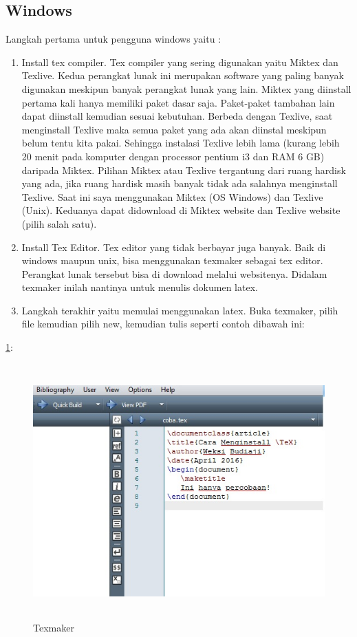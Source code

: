 \subsection{Windows}
\par \vspace{12pt}
Langkah pertama untuk pengguna windows yaitu :

\begin{enumerate}
\item Install tex compiler. Tex compiler yang sering digunakan yaitu Miktex dan Texlive. Kedua perangkat lunak ini merupakan software yang paling banyak digunakan meskipun banyak perangkat lunak yang lain. Miktex yang diinstall pertama kali hanya memiliki paket dasar saja. Paket-paket tambahan lain dapat diinstall kemudian sesuai kebutuhan. Berbeda dengan Texlive, saat menginstall Texlive maka semua paket yang 
ada akan diinstal meskipun belum tentu kita pakai. Sehingga instalasi Texlive lebih lama (kurang lebih 20 menit pada komputer dengan processor pentium i3 dan RAM 6 GB) daripada Miktex. Pilihan Miktex atau Texlive tergantung dari ruang hardisk yang ada, jika ruang hardisk masih banyak tidak ada salahnya menginstall Texlive. Saat ini saya menggunakan Miktex 
(OS Windows) dan Texlive (Unix). Keduanya dapat didownload di Miktex website dan Texlive website (pilih salah satu).
\item Install Tex Editor. Tex editor yang tidak berbayar juga banyak. Baik di windows maupun unix, bisa menggunakan texmaker sebagai tex editor. Perangkat lunak tersebut bisa di download melalui websitenya. Didalam texmaker inilah nantinya untuk menulis dokumen latex.
\item Langkah terakhir yaitu memulai menggunakan latex. Buka texmaker, pilih file kemudian pilih new, kemudian tulis seperti contoh dibawah ini:
\setcounter{numberedCntC}{\theenumi}
\end{enumerate}

\ref{image1.jpg}:
\begin{figure}[ht]
	\centerline{\includegraphics[width=13.54cm,height=9.78cm]{gambar/image1.jpg}}
\caption{Texmaker}
\label{image1.jpg}
\end{figure}

